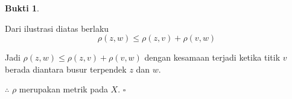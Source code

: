 \documentclass[a4paper]{article}
\theoremstyle{definition}
\newtheorem*{bukti}{Bukti}
\begin{document}
\begin{bukti}
\begin{enumerate}
\begin{itemize}
\begin{center}
        \end{center}
        Dari ilustrasi diatas berlaku
        \[\rho(z,w) \leq \rho(z,v) + \rho(v,w)\]
      \end{itemize}
      Jadi \(\rho(z,w) \leq \rho(z,v) + \rho(v,w)\) dengan kesamaan terjadi ketika titik $v$ berada diantara busur terpendek $z$ dan $w$. 
    \end{enumerate}
    $\therefore$ \(\rho\) merupakan metrik pada \(X\). \(\square\)
  \end{bukti}
\end{document}

